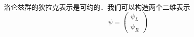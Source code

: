 
洛仑兹群的狄拉克表示是可约的．我们可以构造两个二维表示
\begin{equation}
\psi = \begin{pmatrix}
\psi_L \\
\psi_R
\end{pmatrix}
\end{equation}


